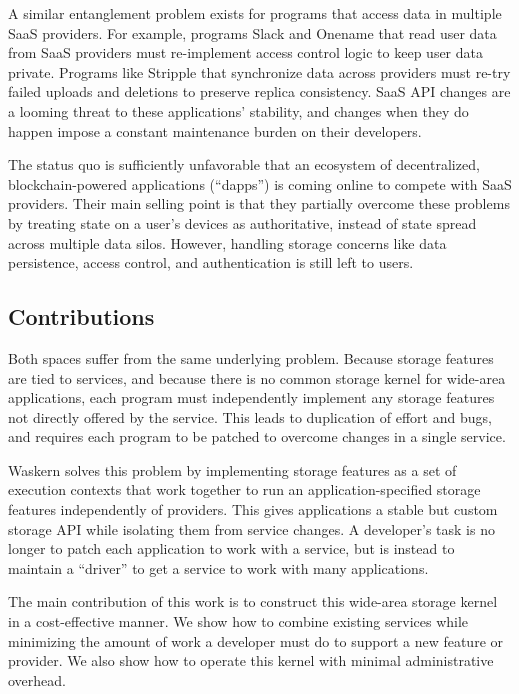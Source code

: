 A similar entanglement problem exists for programs that access data in multiple
SaaS providers.  For example, programs Slack and Onename that read user data
from SaaS providers must re-implement access control logic to keep user
data private.  Programs like Stripple that synchronize data across providers
must re-try failed uploads and deletions to preserve replica consistency. 
SaaS API changes are a looming threat to these applications' stability, and 
changes when they do happen impose a constant
maintenance burden on their developers.

The status quo is sufficiently unfavorable that an ecosystem of decentralized,
blockchain-powered applications (``dapps'') is coming online to compete with SaaS
providers. Their main selling point is that they partially overcome these
problems by treating state on a user's devices as authoritative, instead of
state spread across multiple data silos. However, handling storage concerns
like data persistence, access control, and authentication is still left to
users.

\subsection{Contributions}

Both spaces suffer from the same underlying problem. Because storage features
are tied to services, and because there is no common storage kernel for
wide-area applications, each program must independently implement any storage
features not directly offered by the service.  This leads to duplication of
effort and bugs, and requires each program to be patched to overcome changes in
a single service.

Waskern solves this problem by implementing
storage features as a set of execution contexts that work together to run an 
application-specified storage features independently of providers.  This gives
applications a stable but
custom storage API while isolating them from service changes.  A
developer's task is no longer to patch each application to work with a
service, but is instead to maintain a ``driver'' to get a service to
work with many applications.

The main contribution of this work is to construct this
wide-area storage kernel in a cost-effective manner.  We show how to
combine existing services while minimizing the amount of work
a developer must do to support a new feature or provider.  We also show
how to operate this kernel with minimal administrative overhead.

